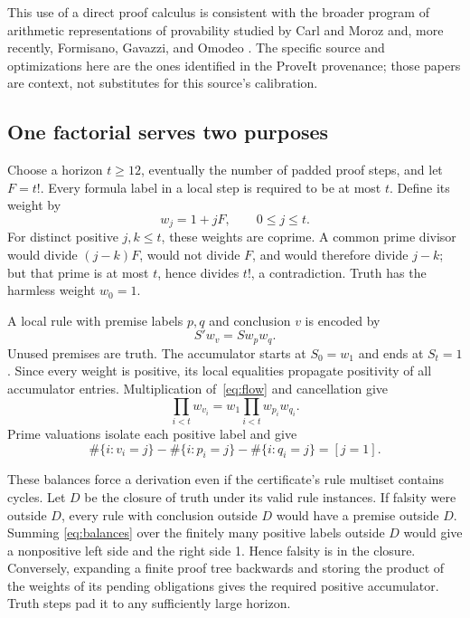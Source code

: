 \documentclass[11pt,letterpaper]{article}
\theoremstyle{remark}\newtheorem{remark}[theorem]{Remark}
\begin{document}
This use of a direct proof calculus is consistent with the broader
program of arithmetic representations of provability studied by Carl
and Moroz and, more recently, Formisano, Gavazzi, and Omodeo
\cite{carlmoroz,fgo}. The specific source and optimizations here are the
ones identified in the ProveIt provenance; those papers are context,
not substitutes for this source's calibration.

\subsection{One factorial serves two purposes}

Choose a horizon \(t\ge12\), eventually the number of padded proof
steps, and let \(F=t!\). Every formula label in a local step is required
to be at most \(t\). Define its weight by
\[
 w_j=1+jF,\qquad 0\le j\le t.
\]
For distinct positive \(j,k\le t\), these weights are coprime. A common
prime divisor would divide \((j-k)F\), would not divide \(F\), and
would therefore divide \(j-k\); but that prime is at most \(t\), hence
divides \(t!\), a contradiction. Truth has the harmless weight \(w_0=1\).

A local rule with premise labels \(p,q\) and conclusion \(v\) is
encoded by
\begin{equation}
 S' w_v=S w_p w_q. \label{eq:flow}
\end{equation}
Unused premises are truth. The accumulator starts at \(S_0=w_1\)
and ends at \(S_t=1\). Since every weight is positive, its local
equalities propagate positivity of all accumulator entries. Multiplication
of~\eqref{eq:flow} and cancellation give
\[
 \prod_{i<t}w_{v_i}=w_1\prod_{i<t}w_{p_i}w_{q_i}.
\]
Prime valuations isolate each positive label and give
\begin{equation}
 \#\{i:v_i=j\}-\#\{i:p_i=j\}-\#\{i:q_i=j\}
       =[j=1]. \label{eq:balances}
\end{equation}

These balances force a derivation even if the certificate's rule multiset
contains cycles. Let \(D\) be the closure of truth under its valid rule
instances. If falsity were outside \(D\), every rule with conclusion
outside \(D\) would have a premise outside \(D\). Summing
\eqref{eq:balances} over the finitely many positive labels outside \(D\)
would give a nonpositive left side and the right side 1. Hence falsity
is in the closure. Conversely, expanding a finite proof tree backwards
and storing the product of the weights of its pending obligations gives
the required positive accumulator. Truth steps pad it to any sufficiently
large horizon.
\end{document}
